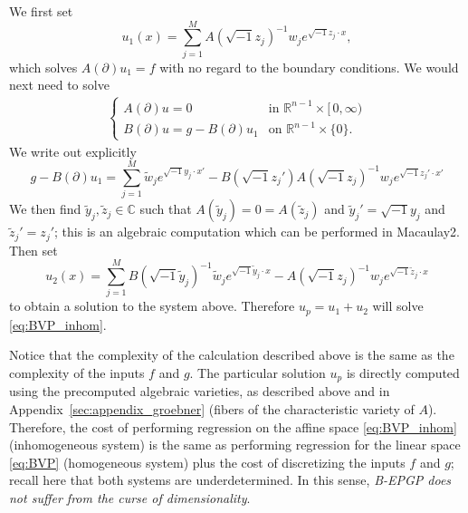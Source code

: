 \documentclass{article} %
\theoremstyle{plain}
\theoremstyle{definition}
\theoremstyle{remark}
\newcommand{\RR}{\mathbb{R}}
\begin{document}
We first set 
$$
u_1(x)=\sum_{j=1}^M A(\sqrt{-1}z_j)^{-1} w_j e^{\sqrt{-1}z_j\cdot x},
$$
which solves $A(\partial) u_1=f$ with no regard to the boundary conditions. We would next need to solve
\begin{align*}
\begin{cases}
        A(\partial)u=0&\text{in }\RR^{n-1}\times[\,0,\infty)\\
    B(\partial)u=g-B(\partial)u_1&\text{on }\RR^{n-1}\times\{0\}.
   \end{cases}
\end{align*}
We write out explicitly 
$$
g-B(\partial)u_1=\sum_{j=1}^M   \tilde w_j e^{\sqrt{-1}y_j\cdot x'}-B(\sqrt{-1}z_j')A(\sqrt{-1}z_j)^{-1} w_j e^{\sqrt{-1}z_j'\cdot x'}
$$
We then find $\tilde y_j,\tilde z_j\in \mathbb C$ such that $A(\tilde y_j)=0=A(\tilde z_j)$ and $\tilde y_j'=\sqrt{-1} y_j$ and $\tilde z_j'=z_j'$; this is an algebraic computation which can be performed in Macaulay2. Then set
$$
u_2(x)=\sum_{j=1}^M B(\sqrt{-1}\tilde y_j)^{-1}\tilde w_j e^{\sqrt{-1} \tilde y_j\cdot x}-A(\sqrt{-1} z_j)^{-1}w_j e^{\sqrt{-1}\tilde z_j\cdot x}
$$
to obtain a solution to the system above. Therefore $u_p=u_1+u_2$ will solve \eqref{eq:BVP_inhom}.



Notice that the complexity of the calculation described above is the same as the complexity of the inputs $f$ and $g$. The particular solution $u_p$ is directly computed using the precomputed algebraic varieties, as described above and in Appendix~\ref{sec:appendix_groebner} (fibers of the characteristic variety of $A$). Therefore, the cost of performing regression on the affine space \eqref{eq:BVP_inhom} (inhomogeneous system) is the same as performing regression for the linear space \eqref{eq:BVP} (homogeneous system) plus the cost of discretizing the inputs $f$ and $g$; recall here that both systems are underdetermined. In this sense, \textit{B-EPGP does not suffer from the curse of dimensionality}.
\end{document}
